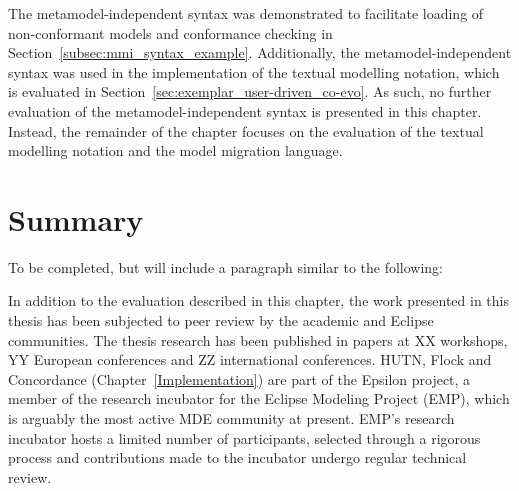 The metamodel-independent syntax was demonstrated to facilitate loading of non-conformant models and conformance checking in Section~\ref{subsec:mmi_syntax_example}. Additionally, the metamodel-independent syntax was used in the implementation of the textual modelling notation, which is evaluated in Section~\ref{sec:exemplar_user-driven_co-evo}. As such, no further evaluation of the metamodel-independent syntax is presented in this chapter. Instead, the remainder of the chapter focuses on the evaluation of the textual modelling notation and the model migration language.








\section{Summary}
To be completed, but will include a paragraph similar to the following:

In addition to the evaluation described in this chapter, the work presented in this thesis has been subjected to peer review by the academic and Eclipse communities. The thesis research has been published in papers at XX workshops, YY European conferences and ZZ international conferences. HUTN, Flock and Concordance (Chapter~\ref{Implementation}) are part of the Epsilon project, a member of the research incubator for the Eclipse Modeling Project (EMP), which is arguably the most active MDE community at present. EMP's research incubator hosts a limited number of participants, selected through a rigorous process and contributions made to the incubator undergo regular technical review.